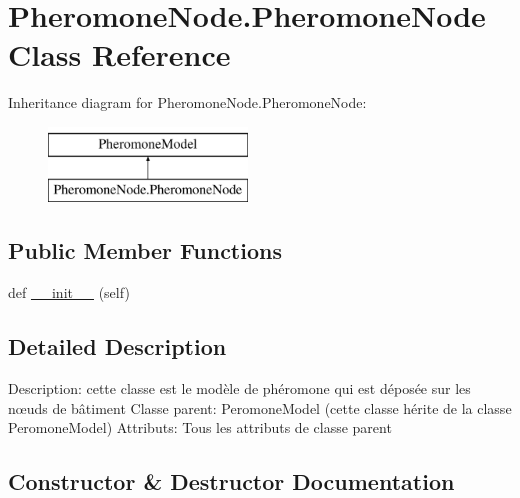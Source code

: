 \hypertarget{class_pheromone_node_1_1_pheromone_node}{}\section{Pheromone\+Node.\+Pheromone\+Node Class Reference}
\label{class_pheromone_node_1_1_pheromone_node}
Inheritance diagram for Pheromone\+Node.\+Pheromone\+Node\+:\begin{figure}[H]
\begin{center}
\leavevmode
\includegraphics[height=2.000000cm]{class_pheromone_node_1_1_pheromone_node}
\end{center}
\end{figure}
\subsection*{Public Member Functions}
\begin{DoxyCompactItemize}
\item 
def \mbox{\hyperlink{class_pheromone_node_1_1_pheromone_node_a7a55026a7737706b59449032e96fe695}{\+\_\+\+\_\+init\+\_\+\+\_\+}} (self)
\end{DoxyCompactItemize}


\subsection{Detailed Description}
\begin{DoxyVerb}Description: cette classe est le modèle de phéromone qui est déposée sur les nœuds de bâtiment
Classe parent: PeromoneModel (cette classe hérite de la classe PeromoneModel)
Attributs:
    Tous les attributs de classe parent
\end{DoxyVerb}
 

\subsection{Constructor \& Destructor Documentation}
\mbox{\label{class_pheromone_node_1_1_pheromone_node_a7a55026a7737706b59449032e96fe695}} 
